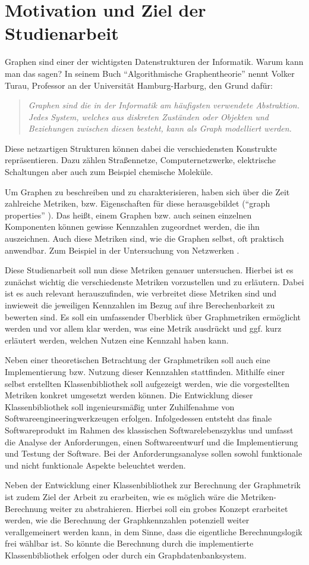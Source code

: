 \documentclass[a4paper,12pt,ngerman,chapterprefix=false,listof=totoc,bibliography=totoc]{scrreprt}
\newcommand{\zitat}[2]{
	\begin{quote}
		\textit{#1} \cite{#2}
	\end{quote}
}
\begin{document}
\section{Motivation und Ziel der Studienarbeit}{
Graphen sind einer der wichtigsten Datenstrukturen der Informatik. Warum kann man das sagen? In seinem Buch "`Algorithmische Graphentheorie"' nennt Volker Turau, Professor an der Universität Hamburg-Harburg, den Grund dafür: 
\zitat{Graphen sind die in der Informatik am häufigsten verwendete Abstraktion. Jedes System, welches aus diskreten Zuständen oder Objekten und Beziehungen zwischen diesen besteht, kann als Graph modelliert werden.}{turau_algorithmische_2004}
Diese netzartigen Strukturen können dabei die verschiedensten Konstrukte repräsentieren. Dazu zählen Straßennetze, Computernetzwerke, elektrische Schaltungen aber auch zum Beispiel chemische Moleküle. \cite{tittmann_graphentheorie_2019}

Um Graphen zu beschreiben und zu charakterisieren, haben sich über die Zeit zahlreiche Metriken, bzw. Eigenschaften für diese herausgebildet ("`graph properties"' \cite{lovasz_large_2012}). Das heißt, einem Graphen bzw. auch seinen einzelnen Komponenten können gewisse Kennzahlen zugeordnet werden, die ihn auszeichnen. Auch diese Metriken sind, wie die Graphen selbst, oft praktisch anwendbar. Zum Beispiel in der Untersuchung von Netzwerken \cite{ellens_graph_2013}.

Diese Studienarbeit soll nun diese Metriken genauer untersuchen. Hierbei ist es zunächst wichtig die verschiedenste Metriken vorzustellen und zu erläutern. Dabei ist es auch relevant herauszufinden, wie verbreitet diese Metriken sind und inwieweit die jeweiligen Kennzahlen im Bezug auf ihre Berechenbarkeit zu bewerten sind. Es soll ein umfassender Überblick über Graphmetriken ermöglicht werden und vor allem klar werden, was eine Metrik ausdrückt und ggf. kurz erläutert werden, welchen Nutzen eine Kennzahl haben kann.

Neben einer theoretischen Betrachtung der Graphmetriken soll auch eine Implementierung bzw. Nutzung dieser Kennzahlen stattfinden. Mithilfe einer selbst erstellten Klassenbibliothek soll aufgezeigt werden, wie die vorgestellten Metriken konkret umgesetzt werden können. Die Entwicklung dieser Klassenbibliothek soll ingenieursmäßig unter Zuhilfenahme von Softwareengineeringwerkzeugen erfolgen. Infolgedessen entsteht das finale Softwareprodukt im Rahmen des klassischen Softwarelebenszyklus und umfasst die Analyse der Anforderungen, einen Softwareentwurf und die Implementierung und Testung der Software. Bei der Anforderungsanalyse sollen sowohl funktionale und nicht funktionale Aspekte beleuchtet werden. \cite{balzert_lehrbuch_2009,balzert_lehrbuch_2011}

Neben der Entwicklung einer Klassenbibliothek zur Berechnung der Graphmetrik ist zudem Ziel der Arbeit zu erarbeiten, wie es möglich wäre die Metriken-Berechnung weiter zu abstrahieren. Hierbei soll ein grobes Konzept erarbeitet werden, wie die Berechnung der Graphkennzahlen potenziell weiter verallgemeinert werden kann, in dem Sinne, dass die eigentliche Berechnungslogik frei wählbar ist. So könnte die Berechnung durch die implementierte Klassenbibliothek erfolgen oder durch ein Graphdatenbanksystem.
}
\end{document}
